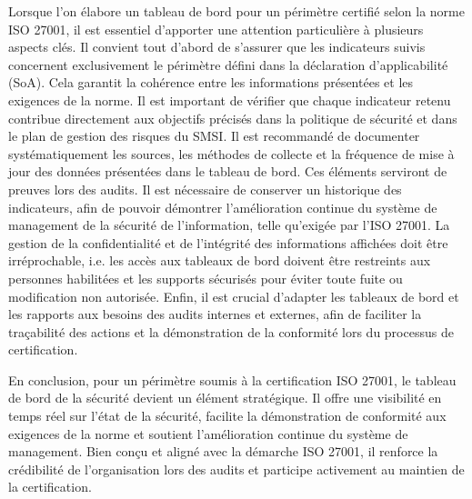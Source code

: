 Lorsque l’on élabore un tableau de bord pour un périmètre certifié selon la norme ISO 27001, il est essentiel d’apporter une attention particulière à plusieurs aspects clés. Il convient tout d’abord de s’assurer que les indicateurs suivis concernent exclusivement le périmètre défini dans la déclaration d’applicabilité (SoA). Cela garantit la cohérence entre les informations présentées et les exigences de la norme. Il est important de vérifier que chaque indicateur retenu contribue directement aux objectifs précisés dans la politique de sécurité et dans le plan de gestion des risques du SMSI. Il est recommandé de documenter systématiquement les sources, les méthodes de collecte et la fréquence de mise à jour des données présentées dans le tableau de bord. Ces éléments serviront de preuves lors des audits. Il est nécessaire de conserver un historique des indicateurs, afin de pouvoir démontrer l’amélioration continue du système de management de la sécurité de l’information, telle qu’exigée par l’ISO 27001.
La gestion de la confidentialité et de l’intégrité des informations affichées doit être irréprochable, i.e. les accès aux tableaux de bord doivent être restreints aux personnes habilitées et les supports sécurisés pour éviter toute fuite ou modification non autorisée.
Enfin, il est crucial d'adapter les tableaux de bord et les rapports aux besoins des audits internes et externes, afin de faciliter la traçabilité des actions et la démonstration de la conformité lors du processus de certification.

En conclusion, pour un périmètre soumis à la certification ISO 27001, le tableau de bord de la sécurité devient un élément stratégique. Il offre une visibilité en temps réel sur l’état de la sécurité, facilite la démonstration de conformité aux exigences de la norme et soutient l’amélioration continue du système de management. Bien conçu et aligné avec la démarche ISO 27001, il renforce la crédibilité de l’organisation lors des audits et participe activement au maintien de la certification.


